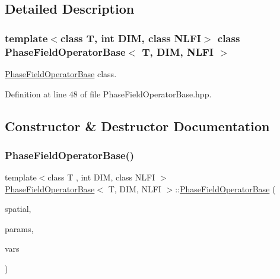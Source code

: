 \subsection{Detailed Description}
\subsubsection*{template$<$class T, int D\+IM, class N\+L\+FI$>$\newline
class Phase\+Field\+Operator\+Base$<$ T, D\+I\+M, N\+L\+F\+I $>$}

\hyperlink{classPhaseFieldOperatorBase}{Phase\+Field\+Operator\+Base} class. 

Definition at line 48 of file Phase\+Field\+Operator\+Base.\+hpp.



\subsection{Constructor \& Destructor Documentation}
\mbox{\label{classPhaseFieldOperatorBase_ae67f14dad2267b47a866e6f1dfb1f39b}} 
\subsubsection{\texorpdfstring{Phase\+Field\+Operator\+Base()}{PhaseFieldOperatorBase()}\hspace{0.1cm}{\footnotesize\ttfamily [1/2]}}
{\footnotesize\ttfamily template$<$class T , int D\+IM, class N\+L\+FI $>$ \\
\hyperlink{classPhaseFieldOperatorBase}{Phase\+Field\+Operator\+Base}$<$ T, D\+IM, N\+L\+FI $>$\+::\hyperlink{classPhaseFieldOperatorBase}{Phase\+Field\+Operator\+Base} (\begin{DoxyParamCaption}\item[{\hyperlink{classSpatialDiscretization}{Spatial\+Discretization}$<$ T, D\+IM $>$ $\ast$}]{spatial,  }\item[{const \hyperlink{classParameters}{Parameters} \&}]{params,  }\item[{\hyperlink{classVariables}{Variables}$<$ T, D\+IM $>$ \&}]{vars }\end{DoxyParamCaption})}



